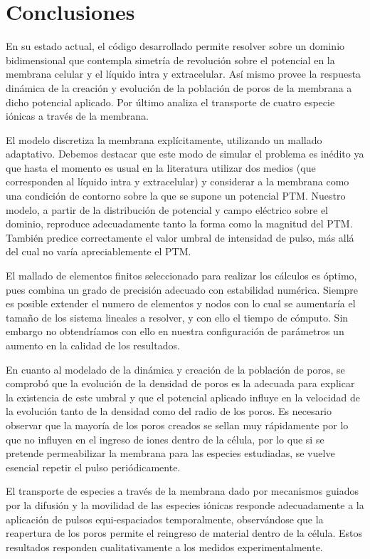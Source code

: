 \chapter{Conclusiones}

En su estado actual, el código desarrollado permite resolver sobre un dominio bidimensional que contempla simetría de revolución sobre el potencial en la membrana celular y el líquido intra y extracelular. Así mismo provee la respuesta dinámica de la creación y evolución de la población de poros de la membrana a dicho potencial aplicado. Por último analiza el transporte de cuatro especie iónicas a través de la membrana.

El modelo discretiza la membrana explícitamente, utilizando un mallado adaptativo. Debemos destacar que este modo de simular el problema es inédito ya que hasta el momento es usual en la literatura utilizar dos medios (que corresponden al líquido intra y extracelular) y considerar a la membrana como una condición de contorno sobre la que se supone un potencial PTM. Nuestro modelo, a partir de la distribución de potencial y campo eléctrico sobre el dominio, reproduce adecuadamente tanto la forma como la magnitud del PTM. También predice correctamente el valor umbral de intensidad de pulso, más allá del cual no varía apreciablemente el PTM.

El mallado de elementos finitos seleccionado para realizar los cálculos es óptimo, pues combina un grado de precisión adecuado con estabilidad numérica. Siempre es posible extender el numero de elementos y nodos con lo cual se aumentaría el tamaño de los sistema lineales a resolver, y con ello el tiempo de cómputo. Sin embargo no obtendríamos con ello en nuestra configuración de parámetros un aumento en la calidad de los resultados.

En cuanto al modelado de la dinámica y creación de la población de poros, se comprobó que la evolución de la densidad de poros es la adecuada para explicar la existencia de este umbral y que el potencial aplicado influye en la velocidad de la evolución tanto de la densidad como del radio de los poros. 
Es necesario observar que la mayoría de los poros creados se sellan muy rápidamente por lo que no influyen en el ingreso de iones dentro de la célula, por lo que si se pretende permeabilizar la membrana para las especies estudiadas, se vuelve esencial repetir el pulso periódicamente. 

El transporte de especies a través de la membrana dado por mecanismos guiados por la difusión y la movilidad de las especies iónicas responde adecuadamente a la aplicación de pulsos equi-espaciados temporalmente, observándose que la reapertura de los poros permite el reingreso de material dentro de la célula. Estos resultados responden cualitativamente a los medidos experimentalmente.\\ 


